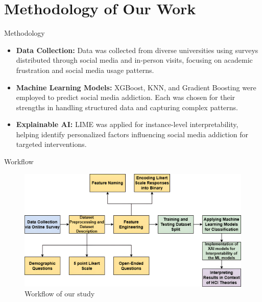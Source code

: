 \documentclass{beamer}
\begin{document}
\section{Methodology of Our Work}
\begin{frame}{Methodology}
    \begin{itemize}
        \item \textbf{Data Collection:} Data was collected from diverse universities using surveys distributed through social media and in-person visits, focusing on academic frustration and social media usage patterns.
        \item \textbf{Machine Learning Models:} XGBoost, KNN, and Gradient Boosting were employed to predict social media addiction. Each was chosen for their strengths in handling structured data and capturing complex patterns.
        \item \textbf{Explainable AI:} LIME was applied for instance-level interpretability, helping identify personalized factors influencing social media addiction for targeted interventions.
    \end{itemize}
\end{frame}


\begin{frame}{Workflow}
\begin{figure}
        \centering
        \includegraphics[width=0.7\linewidth]{workflow.pdf}  %
        \caption{Workflow of our study}
    \end{figure}
\end{frame}
\end{document}
